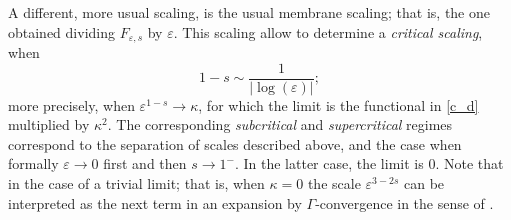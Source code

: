 \documentclass{article}
\newcommand{\e}{\varepsilon}
\begin{document}
 A different, more usual scaling, is the usual membrane scaling; that is, the one obtained dividing $F_{\e,s}$ by $\e$. This scaling allow to determine a {\em critical scaling}, when 
$$
1-s\sim \frac1{|\log(\e)|};
$$
more precisely, when $\e^{1-s}\to \kappa$, for which the limit is the functional  in \eqref{c_d} multiplied by $\kappa^2$. The corresponding {\em subcritical} and {\em supercritical} regimes correspond to the separation of scales described above, and the case when formally $\e\to 0$ first and then  $s\to 1^-$. In the latter case, the limit is $0$. Note that in the case of a trivial limit; that is, when $\kappa=0$ the scale $\e^{3-2s}$ can be interpreted as the next term in an expansion by $\Gamma$-convergence in the sense of \cite{BT}.

%
\end{document}

